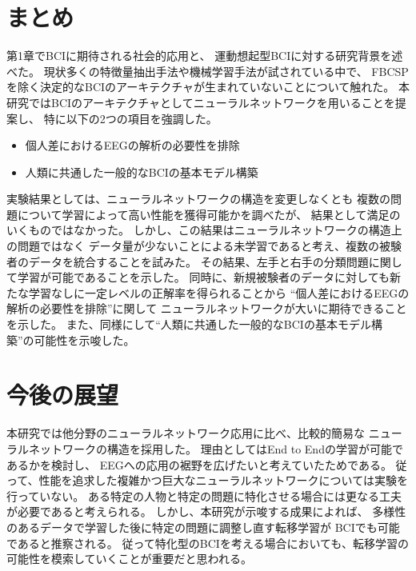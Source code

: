 \section{\mc まとめ}
第1章でBCIに期待される社会的応用と、
運動想起型BCIに対する研究背景を述べた。
現状多くの特徴量抽出手法や機械学習手法が試されている中で、
FBCSPを除く決定的なBCIのアーキテクチャが生まれていないことについて触れた。
本研究ではBCIのアーキテクチャとしてニューラルネットワークを用いることを提案し、
特に以下の2つの項目を強調した。
\begin{itemize}
    \item 個人差におけるEEGの解析の必要性を排除
    \item 人類に共通した一般的なBCIの基本モデル構築
\end{itemize}

実験結果としては、ニューラルネットワークの構造を変更しなくとも
複数の問題について学習によって高い性能を獲得可能かを調べたが、
結果として満足のいくものではなかった。
しかし、この結果はニューラルネットワークの構造上の問題ではなく
データ量が少ないことによる未学習であると考え、複数の被験者のデータを統合することを試みた。
その結果、左手と右手の分類問題に関して学習が可能であることを示した。
同時に、新規被験者のデータに対しても新たな学習なしに一定レベルの正解率を得られることから
``個人差におけるEEGの解析の必要性を排除''に関して
ニューラルネットワークが大いに期待できることを示した。
また、同様にして``人類に共通した一般的なBCIの基本モデル構築''の可能性を示唆した。

\section{\mc 今後の展望}
本研究では他分野のニューラルネットワーク応用に比べ、比較的簡易な
ニューラルネットワークの構造を採用した。
理由としてはEnd to Endの学習が可能であるかを検討し、
EEGへの応用の裾野を広げたいと考えていたためである。
従って、性能を追求した複雑かつ巨大なニューラルネットワークについては実験を行っていない。
ある特定の人物と特定の問題に特化させる場合には更なる工夫が必要であると考えられる。
しかし、本研究が示唆する成果によれば、
多様性のあるデータで学習した後に特定の問題に調整し直す転移学習が
BCIでも可能であると推察される。
従って特化型のBCIを考える場合においても、転移学習の可能性を模索していくことが重要だと思われる。
